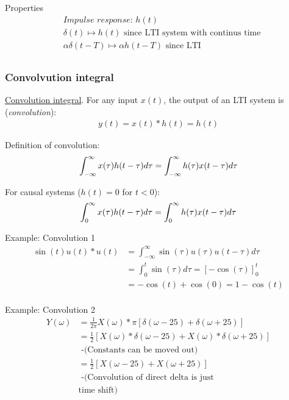 \begin{multicols}{2}
Properties
\begin{align*}
    &\textit{Impulse response: } h(t) \\
    &\delta(t) \mapsto h(t) \text{ since LTI system with continus time}\\
    &\alpha\delta(t-T) \mapsto \alpha h(t-T) \text{ since LTI}\\
\end{align*}


\subsubsection{Convolvution integral}
\href{https://www.youtube.com/watch?v=35gc3GE4Ddo}{Convolution integral}.
For any input $x(t)$, the output of an LTI system is (\textit{convolution}):
\begin{align*}
    y(t) = x(t)*h(t) = h(t)
\end{align*}

\noindent Definition of convolution:
\begin{equation}
    \int_{-\infty}^{\infty}x(\tau)h(t-\tau)d\tau = \int_{-\infty}^{\infty}h(\tau)x(t-\tau)d\tau \\
\end{equation}

\noindent For causal systems ($h(t)=0$ for $t<0$):
\begin{equation}
    \int_{0}^{\infty}x(\tau)h(t-\tau)d\tau = \int_{0}^{\infty}h(\tau)x(t-\tau)d\tau \\
\end{equation}


\begin{exampleblock}{Example: Convolution 1}
\begin{align*}
    \sin(t)u(t)*u(t) &= \int_{-\infty}^{\infty} \sin(\tau)u(\tau)u(t-\tau)d\tau \\
    &= \int_{0}^{t} \sin(\tau)d\tau = [-\cos(\tau)]_0^t \\
    &= -\cos(t)+\cos(0) = 1- \cos(t) \\
\end{align*}    
\end{exampleblock}

\begin{exampleblock}{Example: Convolution 2}
\begin{align*}
    Y(\omega) &= \frac{1}{2\pi}X(\omega) * \pi [\delta(\omega-25)+\delta(\omega+25)] \\
    &= \frac{1}{2}[X(\omega)*\delta(\omega-25) + X(\omega)*\delta(\omega+25)] \\
    &\text{ -(Constants can be moved out)} \\
    &= \frac{1}{2}[X(\omega-25) + X(\omega+25)] \\
    &\text{ -(Convolution of direct delta is just} \\
    &\text{time shift)}
\end{align*}    
\end{exampleblock}



\end{multicols}
